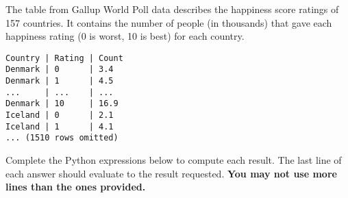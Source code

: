 \question The  table from Gallup World Poll data describes the
happiness score ratings of 157 countries. It contains the number of people (in
thousands) that gave each happiness rating (0 is worst, 10 is best) for each
country.

\begin{verbatim}
Country | Rating | Count
Denmark | 0      | 3.4
Denmark | 1      | 4.5
...     | ...    | ...
Denmark | 10     | 16.9
Iceland | 0      | 2.1
Iceland | 1      | 4.1
... (1510 rows omitted)
\end{verbatim}

Complete the Python expressions below to compute each result. The last line of
each answer should evaluate to the result requested. \textbf{You may not use
more lines than the ones provided.}

